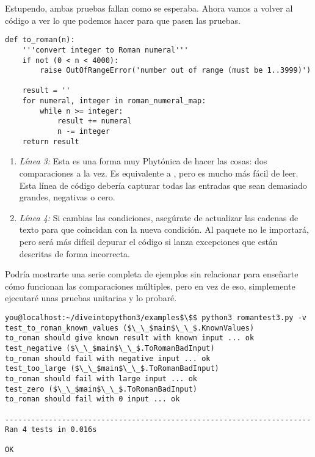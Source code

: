 Estupendo, ambas pruebas fallan como se esperaba. Ahora vamos a volver al código a ver lo que podemos hacer para que pasen las pruebas.

\noindent\begin{minipage}{\textwidth}
\begin{lstlisting}[mathescape=True]
def to_roman(n):
    '''convert integer to Roman numeral'''
    if not (0 < n < 4000):
        raise OutOfRangeError('number out of range (must be 1..3999)')

    result = ''
    for numeral, integer in roman_numeral_map:
        while n >= integer:
            result += numeral
            n -= integer
    return result
\end{lstlisting}
\end{minipage}

\begin{enumerate}

\item \emph{Línea 3:} Esta es una forma muy Phytónica de hacer las cosas: dos comparaciones a la vez. Es equivalente a , pero es mucho más fácil de leer. Esta línea de código debería capturar todas las entradas que sean demasiado grandes, negativas o cero.

\item \emph{Línea 4:} Si cambias las condiciones, asegúrate de actualizar las cadenas de texto para que coincidan con la nueva condición. Al paquete  no le importará, pero será más difícil depurar el código si lanza excepciones que están descritas de forma incorrecta.

\end{enumerate}

Podría mostrarte una serie completa de ejemplos sin relacionar para enseñarte cómo funcionan las comparaciones múltiples, pero en vez de eso, simplemente ejecutaré unas pruebas unitarias y lo probaré.

\noindent\begin{minipage}{\textwidth}
\begin{lstlisting}[mathescape=True]
you@localhost:~/diveintopython3/examples$\$$ python3 romantest3.py -v
test_to_roman_known_values ($\_\_$main$\_\_$.KnownValues)
to_roman should give known result with known input ... ok
test_negative ($\_\_$main$\_\_$.ToRomanBadInput)
to_roman should fail with negative input ... ok
test_too_large ($\_\_$main$\_\_$.ToRomanBadInput)
to_roman should fail with large input ... ok
test_zero ($\_\_$main$\_\_$.ToRomanBadInput)
to_roman should fail with 0 input ... ok

----------------------------------------------------------------------
Ran 4 tests in 0.016s

OK
\end{lstlisting}
\end{minipage}

